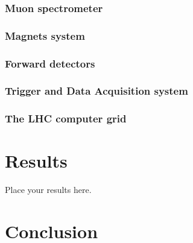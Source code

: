 \documentclass[11pt,twoside]{book}
\begin{document}
\subsection{Muon spectrometer}
\label{sec:muon}

\subsection{Magnets system}
\label{sec:coordinates}

\subsection{Forward detectors}
\label{sec:fwd}

\subsection{Trigger and Data Acquisition system}
\label{sec:trigger}

\subsection{The LHC computer grid}
\label{sec:grid}


\chapter{Results}
\label{chap:result}

Place your results here.



\chapter{Conclusion}
\label{chap:conclusion}
\end{document}
